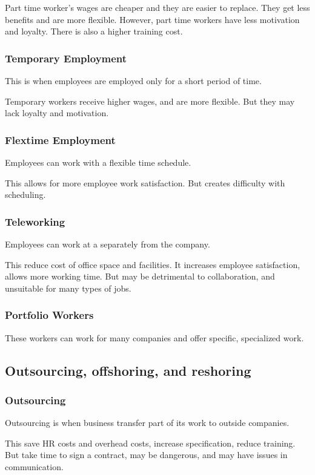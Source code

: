 \documentclass{standalone}
\begin{document}
Part time worker's wages are cheaper and they are easier to replace.
They get less benefits and are more flexible.
However, part time workers have less motivation and loyalty.
There is also a higher training cost.

\subsubsection{Temporary Employment}
This is when employees are employed only for a short period of time.

Temporary workers receive higher wages, and are more flexible.
But they may lack loyalty and motivation.

\subsubsection{Flextime Employment}
Employees can work with a flexible time schedule.

This allows for more employee work satisfaction.
But creates difficulty with scheduling.

\subsubsection{Teleworking}
Employees can work at a separately from the company.

This reduce cost of office space and facilities.
It increases employee satisfaction, allows more working time.
But may be detrimental to collaboration, and unsuitable for many types of jobs.

\subsubsection{Portfolio Workers}
These workers can work for many companies and offer specific, specialized work.

\subsection{Outsourcing, offshoring, and reshoring}

\subsubsection{Outsourcing}
Outsourcing is when business transfer part of its work to outside companies.

This save HR costs and overhead costs, increase specification, reduce training.
But take time to sign a contract, may be dangerous, and may have issues in communication.
\end{document}
